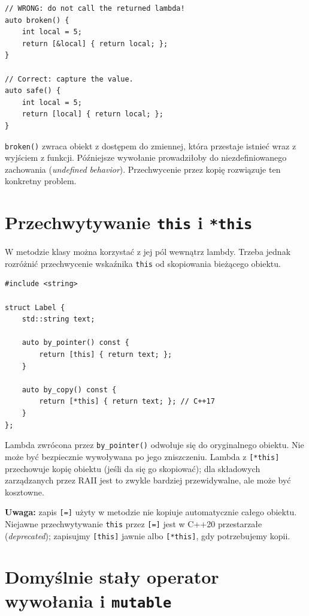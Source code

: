 \begin{lstlisting}
// WRONG: do not call the returned lambda!
auto broken() {
    int local = 5;
    return [&local] { return local; };
}

// Correct: capture the value.
auto safe() {
    int local = 5;
    return [local] { return local; };
}
\end{lstlisting}

\texttt{broken()} zwraca obiekt z dostępem do zmiennej, która przestaje
istnieć wraz z wyjściem z funkcji. Późniejsze wywołanie prowadziłoby
do niezdefiniowanego zachowania (\textit{undefined behavior}).
Przechwycenie przez kopię rozwiązuje ten konkretny problem.

\section{Przechwytywanie \texttt{this} i \texttt{*this}}
\label{sec:lambda-this}

W metodzie klasy można korzystać z jej pól wewnątrz lambdy. Trzeba
jednak rozróżnić przechwycenie wskaźnika \texttt{this} od skopiowania
bieżącego obiektu.

\begin{lstlisting}
#include <string>

struct Label {
    std::string text;

    auto by_pointer() const {
        return [this] { return text; };
    }

    auto by_copy() const {
        return [*this] { return text; }; // C++17
    }
};
\end{lstlisting}

Lambda zwrócona przez \texttt{by\_pointer()} odwołuje się do oryginalnego
obiektu. Nie może być bezpiecznie wywoływana po jego zniszczeniu.
Lambda z \texttt{[*this]} przechowuje kopię obiektu (jeśli da się go
skopiować); dla składowych zarządzanych przez RAII jest to zwykle
bardziej przewidywalne, ale może być kosztowne.

\textbf{Uwaga:} zapis \texttt{[=]} użyty w metodzie nie kopiuje automatycznie
całego obiektu. Niejawne przechwytywanie \texttt{this} przez \texttt{[=]}
jest w C++20 przestarzałe (\textit{deprecated}); zapisujmy
\texttt{[this]} jawnie albo \texttt{[*this]}, gdy potrzebujemy kopii.

\section{Domyślnie stały operator wywołania i \texttt{mutable}}

